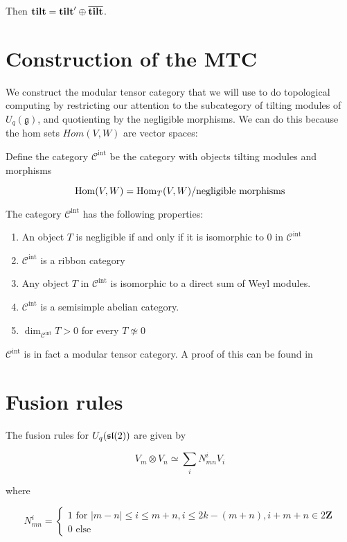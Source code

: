 Then $\mathbf{tilt}= \mathbf{tilt}' \oplus \overline{\mathbf{tilt}}$. 


\section{Construction of the MTC}
\label{MTC-construction}

We construct the modular tensor category that we will use to do topological
computing by restricting our attention to the subcategory of tilting modules of
$U_q(\mathfrak{g})$, and quotienting by the negligible morphisms. We can do
this because the hom sets $Hom(V,W)$ are vector spaces:

\begin{defn}
    Define the category $\mathcal{C}^\text{int}$ be the category with objects tilting modules and morphisms 

    \begin{equation*}
        \operatorname{Hom}(V,W) = \operatorname{Hom}_T(V,W) / \text{negligible morphisms}
    \end{equation*}

\end{defn}

The category $\mathcal{C}^\text{int}$ has the following properties:
\begin{enumerate}
    \item An object $T$ is negligible if and only if it is isomorphic to 0 in $\mathcal{C}^\text{int}$
    \item  $\mathcal{C}^\text{int}$ is a ribbon category
    \item Any object $T$ in $\mathcal{C}^\text{int}$ is isomorphic to a direct sum of Weyl modules.
    \item $\mathcal{C}^\text{int}$ is a semisimple abelian category. 
    \item $\dim_{\mathcal{C}^\text{int}} T > 0$ for every $T \not\simeq 0$
\end{enumerate}

$\mathcal{C}^\text{int}$ is in fact a modular tensor category. A proof of this
can be found in \cite{Kirillov} 
 
\section{Fusion rules}

The fusion rules for $U_q(\mathfrak{sl}(2))$ are given by 

\begin{equation}
    V_m \otimes V_n \simeq \sum_i N_{mn}^i V_i
\end{equation}

where 

\begin{equation}
    N_{mn}^i = \begin{cases} 1 \text{ for } |m-n| \leq i \leq m+n, i \leq 2k - (m+n), i + m + n \in 2 \mathbf{Z} \\
                             0 \text{ else } 
               \end{cases}
\end{equation}



